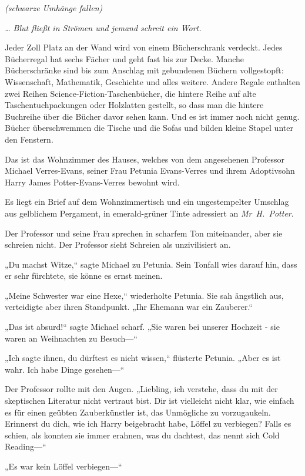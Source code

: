 {\emph{(schwarze Umhänge fallen)}

\emph{… Blut fließt in Strömen und jemand schreit ein Wort.}

\later

Jeder Zoll Platz an der Wand wird von einem Bücherschrank verdeckt. Jedes Bücherregal hat sechs Fächer und geht fast bis zur Decke. Manche Bücherschränke sind bis zum Anschlag mit gebundenen Büchern vollgestopft: Wissenschaft, Mathematik, Geschichte und alles weitere. Andere Regale enthalten zwei Reihen Science-Fiction-Taschenbücher, die hintere Reihe auf alte Taschentuchpackungen oder Holzlatten gestellt, so dass man die hintere Buchreihe über die Bücher davor sehen kann. Und es ist immer noch nicht genug. Bücher überschwemmen die Tische und die Sofas und bilden kleine Stapel unter den Fenstern.

Das ist das Wohnzimmer des Hauses, welches von dem angesehenen Professor Michael Verres-Evans, seiner Frau Petunia Evans-Verres und ihrem Adoptivsohn Harry James Potter-Evans-Verres bewohnt wird.

Es liegt ein Brief auf dem Wohnzimmertisch und ein ungestempelter Umschlag aus gelblichem Pergament, in emerald-grüner Tinte adressiert an \emph{Mr~H.~Potter}.

Der Professor und seine Frau sprechen in scharfem Ton miteinander, aber sie schreien nicht. Der Professor sieht Schreien als unzivilisiert an.

„Du machst Witze,“ sagte Michael zu Petunia. Sein Tonfall wies darauf hin, dass er sehr fürchtete, sie könne es ernst meinen.

„Meine Schwester war eine Hexe,“ wiederholte Petunia. Sie sah ängstlich aus, verteidigte aber ihren Standpunkt. „Ihr Ehemann war ein Zauberer.“

„Das ist absurd!“ sagte Michael scharf. „Sie waren bei unserer Hochzeit - sie waren an Weihnachten zu Besuch—“

„Ich sagte ihnen, du dürftest es nicht wissen,“ flüsterte Petunia. „Aber es ist wahr. Ich habe Dinge gesehen—“

Der Professor rollte mit den Augen. „Liebling, ich verstehe, dass du mit der skeptischen Literatur nicht vertraut bist. Dir ist vielleicht nicht klar, wie einfach es für einen geübten Zauberkünstler ist, das Unmögliche zu vorzugaukeln. Erinnerst du dich, wie ich Harry beigebracht habe, Löffel zu verbiegen? Falls es schien, als konnten sie immer erahnen, was du dachtest, das nennt sich Cold Reading—“

„Es war kein Löffel verbiegen—“

}
